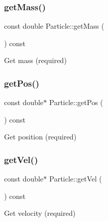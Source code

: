 \hypertarget{classParticle_a2576aff503f68e78ced91406512b1255}{}\label{classParticle_a2576aff503f68e78ced91406512b1255} 
\subsubsection{\texorpdfstring{get\+Mass()}{getMass()}}
{\footnotesize\ttfamily const double Particle\+::get\+Mass (\begin{DoxyParamCaption}{ }\end{DoxyParamCaption}) const\hspace{0.3cm}{\ttfamily [inline]}}



Get mass (required) 

\hypertarget{classParticle_a4ec76421cddd91b1f27357fb182f6923}{}\label{classParticle_a4ec76421cddd91b1f27357fb182f6923} 
\subsubsection{\texorpdfstring{get\+Pos()}{getPos()}}
{\footnotesize\ttfamily const double$\ast$ Particle\+::get\+Pos (\begin{DoxyParamCaption}{ }\end{DoxyParamCaption}) const\hspace{0.3cm}{\ttfamily [inline]}}



Get position (required) 

\hypertarget{classParticle_ab3d63df7f8c22f232b096ae33b6ea3ac}{}\label{classParticle_ab3d63df7f8c22f232b096ae33b6ea3ac} 
\subsubsection{\texorpdfstring{get\+Vel()}{getVel()}}
{\footnotesize\ttfamily const double$\ast$ Particle\+::get\+Vel (\begin{DoxyParamCaption}{ }\end{DoxyParamCaption}) const\hspace{0.3cm}{\ttfamily [inline]}}



Get velocity (required) 

\hypertarget{classParticle_a662b86df904c9a664e0e45d93b1f4715}{}\label{classParticle_a662b86df904c9a664e0e45d93b1f4715} 
